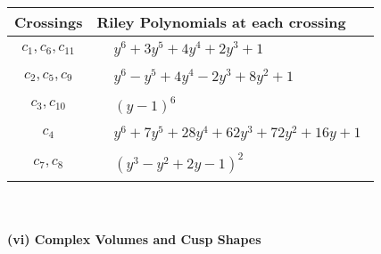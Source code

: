 \documentclass[1p]{elsarticle_modified}
\theoremstyle{definition}
\begin{document}
\begin{tabular}{m{50pt}|m{274pt}}
Crossings & \hspace{64pt}Riley Polynomials at each crossing \\
\hline $$\begin{aligned}c_{1},c_{6},c_{11}\end{aligned}$$&$\begin{aligned}
&y^6+3 y^5+4 y^4+2 y^3+1
\end{aligned}$\\
\hline $$\begin{aligned}c_{2},c_{5},c_{9}\end{aligned}$$&$\begin{aligned}
&y^6- y^5+4 y^4-2 y^3+8 y^2+1
\end{aligned}$\\
\hline $$\begin{aligned}c_{3},c_{10}\end{aligned}$$&$\begin{aligned}
&(y-1)^6
\end{aligned}$\\
\hline $$\begin{aligned}c_{4}\end{aligned}$$&$\begin{aligned}
&y^6+7 y^5+28 y^4+62 y^3+72 y^2+16 y+1
\end{aligned}$\\
\hline $$\begin{aligned}c_{7},c_{8}\end{aligned}$$&$\begin{aligned}
&(y^3- y^2+2 y-1)^2
\end{aligned}$\\
\hline
\end{tabular}\\~\\
\newpage\flushleft \textbf{(vi) Complex Volumes and Cusp Shapes}
\end{document}
